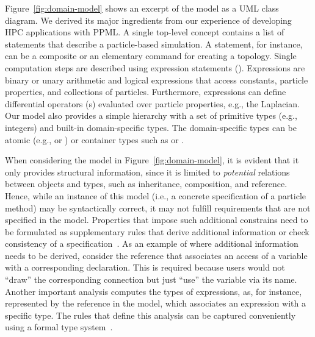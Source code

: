 Figure~\ref{fig:domain-model} shows an excerpt of the model as a UML class diagram. We derived its major ingredients from our experience of developing HPC applications with PPML. A single top-level concept  contains a list of 
statements that describe a particle-based simulation. A statement, for instance, can be a composite  
or an elementary command for creating a topology. Single computation steps are described using expression statements
(). Expressions are binary or unary arithmetic and logical expressions that access constants,
particle properties, and collections of particles. Furthermore, expressions can define differential operators (s)
evaluated over particle properties, e.g., the Laplacian. 
%
Our model also provides a simple  hierarchy with a set of primitive types (e.g., integers) and built-in domain-specific 
types. The domain-specific types can be atomic (e.g.,  or ) or container types such as 
 or . 

When considering the model in Figure~\ref{fig:domain-model}, it is evident that it only provides structural
information, since it is limited to \emph{potential} relations between objects and types, such as inheritance, 
composition, and reference. Hence, while an instance of this model (i.e., a concrete specification of a particle method) 
may be syntactically correct, it may not fulfill requirements that are not specified in the model. 
Properties that impose such additional constrains need to be formulated as supplementary rules that derive additional information 
or check consistency of a specification~\cite{buerger_reference_2011}. 
%
As an example of where additional information needs to be derived, consider the  reference that associates 
an access of a variable with a corresponding declaration. This is required because users would not ``draw'' the corresponding 
connection but just ``use'' the variable via its name. 
%
Another important analysis computes the types of expressions, as, for instance, represented by the  reference 
in the model, which associates an expression with a specific type. The rules that define this analysis can be captured 
conveniently using a formal type system~\cite{Plotkin1981}. 


